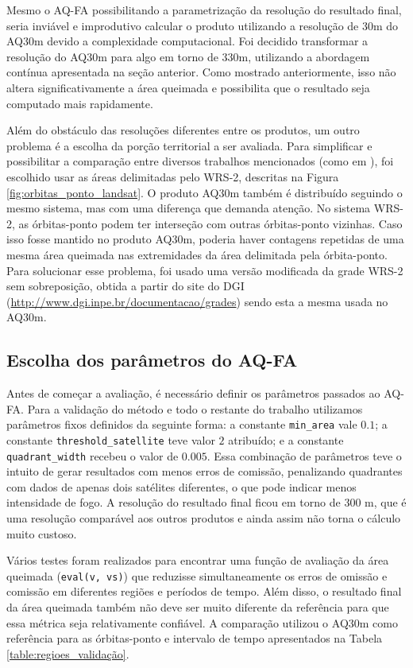 \documentclass[cic,tc]{iiufrgs}
\begin{document}
Mesmo o AQ-FA possibilitando a parametrização da resolução do resultado final, seria inviável e improdutivo calcular o produto utilizando a resolução de 30m do AQ30m devido a complexidade computacional. Foi decidido transformar a resolução do AQ30m para algo em torno de 330m, utilizando a abordagem contínua apresentada na seção anterior. Como mostrado anteriormente, isso não altera significativamente a área queimada e possibilita que o resultado seja computado mais rapidamente.

Além do obstáculo das resoluções diferentes entre os produtos, um outro problema é a escolha da porção territorial a ser avaliada. Para simplificar e possibilitar a comparação entre diversos trabalhos mencionados (como em \citet{libonati2015algorithm}), foi escolhido usar as áreas delimitadas pelo WRS-2, descritas na Figura \ref{fig:orbitas_ponto_landsat}. O produto AQ30m também é distribuído seguindo o mesmo sistema, mas com uma diferença que demanda atenção. No sistema WRS-2, as órbitas-ponto podem ter interseção com outras órbitas-ponto vizinhas. Caso isso fosse mantido no produto AQ30m, poderia haver contagens repetidas de uma mesma área queimada nas extremidades da área delimitada pela órbita-ponto. Para solucionar esse problema, foi usado uma versão modificada da grade WRS-2 sem sobreposição, obtida a partir do site do DGI (\url{http://www.dgi.inpe.br/documentacao/grades}) sendo esta a mesma usada no AQ30m.

\subsection*{Escolha dos parâmetros do AQ-FA}

Antes de começar a avaliação, é necessário definir os parâmetros passados ao AQ-FA. Para a validação do método e todo o restante do trabalho utilizamos parâmetros fixos definidos da seguinte forma: a constante \texttt{min\_area} vale $0.1$; a constante \texttt{threshold\_satellite} teve valor $2$ atribuído; e a constante \texttt{quadrant\_width} recebeu o valor de $0.005$. Essa combinação de parâmetros teve o intuito de gerar resultados com menos erros de comissão, penalizando quadrantes com dados de apenas dois satélites diferentes, o que pode indicar menos intensidade de fogo. A resolução do resultado final ficou em torno de 300 m, que é uma resolução comparável aos outros produtos e ainda assim não torna o cálculo muito custoso.

Vários testes foram realizados para encontrar uma função de avaliação da área queimada (\texttt{eval(v, vs)}) que reduzisse simultaneamente os erros de omissão e comissão em diferentes regiões e períodos de tempo. Além disso, o resultado final da área queimada também não deve ser muito diferente da referência para que essa métrica seja relativamente confiável. A comparação utilizou o AQ30m como referência para as órbitas-ponto e intervalo de tempo apresentados na Tabela \ref{table:regioes_validação}. 
\end{document}
